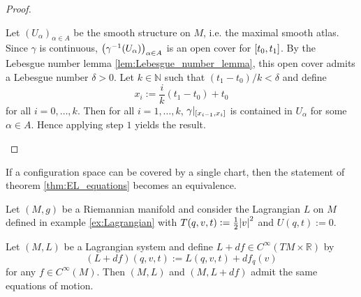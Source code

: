 \begin{proof}
\begin{enumerate}[label = \textit{Step \arabic*:},wide=0pt]
			Let $(U_\alpha)_{\alpha \in A}$ be the smooth structure on $M$, i.e. the maximal smooth atlas. Since $\gamma$ is continuous, $\del[1]{\gamma^{-1}(U_\alpha)}_{\alpha \in A}$ is an open cover for $\intcc[0]{t_0,t_1}$. By the Lebesgue number lemma \ref{lem:Lebesgue_number_lemma}, this open cover admits a Lebesgue number $\delta > 0$. Let $k \in \mathbb{N}$ such that $(t_1 - t_0)/k < \delta$ and define
			\begin{equation*}
				x_i := \frac{i}{k}(t_1 - t_0) + t_0
			\end{equation*}
			\noindent for all $i = 0,\dots,k$. Then for all $i = 1,\dots,k$, $\gamma\vert_{\intcc[0]{x_{i - 1},x_i}}$ is contained in $U_\alpha$ for some $\alpha \in A$. Hence applying step $1$ yields the result.
	\end{enumerate}
\end{proof}

\begin{remark}
	\label{rem:global_chart}
	If a configuration space can be covered by a single chart, then the statement of theorem \ref{thm:EL_equations} becomes an equivalence.
\end{remark}

\begin{example}
	Let $(M,g)$ be a Riemannian manifold and consider the Lagrangian $L$ on $M$ defined in example \ref{ex:Lagrangian} with $T(q,v,t) := \frac{1}{2}\abs{v}^2$ and $U(q,t) := 0$. 
\end{example}

\begin{lemma}
	\label{prop:same_equations_of_motion}
	Let $(M,L)$ be a Lagrangian system and define $L + df \in C^\infty(TM \times \mathbb{R})$ by
	\begin{equation*}
		(L + df)(q,v,t) := L(q,v,t) + df_q(v)
	\end{equation*}
	\noindent for any $f \in C^\infty(M)$. Then $(M,L)$ and $(M,L + df)$ admit the same equations of motion.
\end{lemma}

